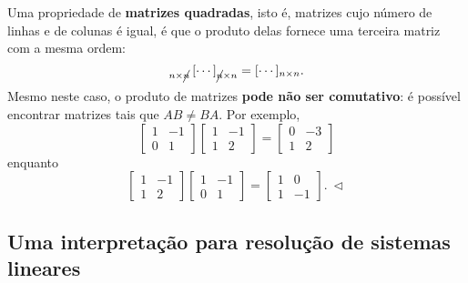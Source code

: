 \documentclass[../livro.tex]{subfiles}  %
\begin{document}
\begin{example}
	Uma propriedade de \textbf{matrizes quadradas}, isto é, matrizes cujo número de linhas e de colunas é igual, é que o produto delas fornece uma terceira matriz com a mesma ordem:
	\begin{equation}
	[\cdots]_{n \times \cancel{n}} \, [\cdots]_{\cancel{n} \times n} = [\cdots]_{n \times n}.
	\end{equation} Mesmo neste caso, o produto de matrizes \textbf{pode não ser comutativo}: é possível encontrar matrizes tais que $AB \neq BA$. Por exemplo,
	\begin{equation}
	\left[
	\begin{array}{cc}
	1 & -1  \\
	0 &  1  
	\end{array}
	\right]
	\left[
	\begin{array}{cc}
	1 & -1  \\
	1 &  2  
	\end{array}
	\right] =
	\left[
	\begin{array}{cc}
	0 & -3  \\
	1 &  2  
	\end{array}
	\right]
	\end{equation} enquanto
	\begin{equation}
	\left[
	\begin{array}{cc}
	1 & -1  \\
	1 &  2  
	\end{array}
	\right]
	\left[
	\begin{array}{cc}
	1 & -1  \\
	0 &  1  
	\end{array}
	\right] =
	\left[
	\begin{array}{cc}
	1 & 0  \\
	1 & -1  
	\end{array}
	\right]. \ \lhd
	\end{equation}
\end{example}





\subsection{Uma interpretação para resolução de sistemas lineares}\label{scn:resolucao-2-sistemas}
\end{document}

